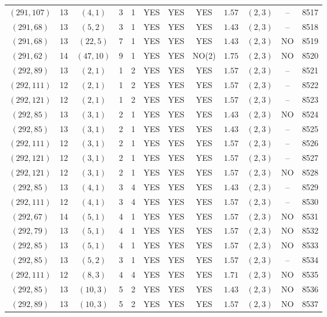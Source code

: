 \begin{longtable}{|c|c|c|c|c|c|c|c|c|c|c|c|}
$(291,107)$ & 13 & $(4,1)$ & 3 & 1 & YES & YES & YES & $1.57$ & $(2,3)$ & -- & 8517\\
$(291,68)$ & 13 & $(5,2)$ & 3 & 1 & YES & YES & YES & $1.43$ & $(2,3)$ & -- & 8518\\
$(291,68)$ & 13 & $(22,5)$ & 7 & 1 & YES & YES & YES & $1.43$ & $(2,3)$ & NO & 8519\\
$(291,62)$ & 14 & $(47,10)$ & 9 & 1 & YES & YES & NO(2) & $1.75$ & $(2,3)$ & NO & 8520\\
$(292,89)$ & 13 & $(2,1)$ & 1 & 2 & YES & YES & YES & $1.57$ & $(2,3)$ & -- & 8521\\
$(292,111)$ & 12 & $(2,1)$ & 1 & 2 & YES & YES & YES & $1.57$ & $(2,3)$ & -- & 8522\\
$(292,121)$ & 12 & $(2,1)$ & 1 & 2 & YES & YES & YES & $1.57$ & $(2,3)$ & -- & 8523\\
$(292,85)$ & 13 & $(3,1)$ & 2 & 1 & YES & YES & YES & $1.43$ & $(2,3)$ & NO & 8524\\
$(292,85)$ & 13 & $(3,1)$ & 2 & 1 & YES & YES & YES & $1.43$ & $(2,3)$ & -- & 8525\\
$(292,111)$ & 12 & $(3,1)$ & 2 & 1 & YES & YES & YES & $1.57$ & $(2,3)$ & -- & 8526\\
$(292,121)$ & 12 & $(3,1)$ & 2 & 1 & YES & YES & YES & $1.57$ & $(2,3)$ & -- & 8527\\
$(292,121)$ & 12 & $(3,1)$ & 2 & 1 & YES & YES & YES & $1.57$ & $(2,3)$ & NO & 8528\\
$(292,85)$ & 13 & $(4,1)$ & 3 & 4 & YES & YES & YES & $1.43$ & $(2,3)$ & -- & 8529\\
$(292,111)$ & 12 & $(4,1)$ & 3 & 4 & YES & YES & YES & $1.57$ & $(2,3)$ & -- & 8530\\
$(292,67)$ & 14 & $(5,1)$ & 4 & 1 & YES & YES & YES & $1.57$ & $(2,3)$ & NO & 8531\\
$(292,79)$ & 13 & $(5,1)$ & 4 & 1 & YES & YES & YES & $1.57$ & $(2,3)$ & NO & 8532\\
$(292,85)$ & 13 & $(5,1)$ & 4 & 1 & YES & YES & YES & $1.57$ & $(2,3)$ & NO & 8533\\
$(292,85)$ & 13 & $(5,2)$ & 3 & 1 & YES & YES & YES & $1.57$ & $(2,3)$ & -- & 8534\\
$(292,111)$ & 12 & $(8,3)$ & 4 & 4 & YES & YES & YES & $1.71$ & $(2,3)$ & NO & 8535\\
$(292,85)$ & 13 & $(10,3)$ & 5 & 2 & YES & YES & YES & $1.43$ & $(2,3)$ & NO & 8536\\
$(292,89)$ & 13 & $(10,3)$ & 5 & 2 & YES & YES & YES & $1.57$ & $(2,3)$ & NO & 8537\\

\end{longtable}
